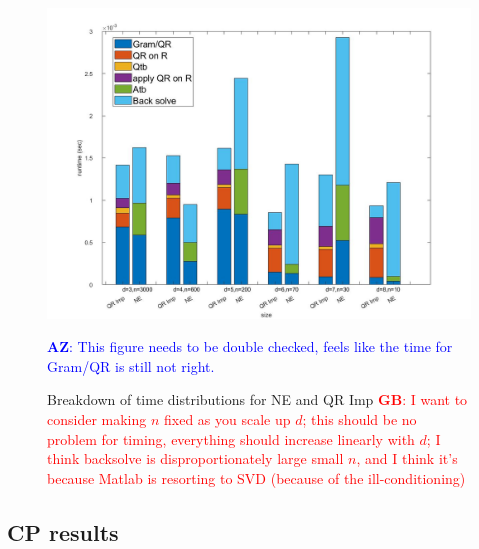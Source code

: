 \documentclass{article}
\newcommand{\GB}[1]{\textcolor{red}{\textbf{GB}: #1}}
\newcommand{\AZ}[1]{\textcolor{blue}{\textbf{AZ}: #1}}
\begin{document}
\begin{figure}[!ht]
  
  \begin{center}
    \includegraphics*[scale = 0.35]{fig_LS_breakdown.jpg}
    \caption[Figure]{Breakdown of time distributions for NE and QR Imp \GB{I want to consider making $n$ fixed as you scale up $d$; this should be no problem for timing, everything should increase linearly with $d$; I think backsolve is disproportionately large small $n$, and I think it's because Matlab is resorting to SVD (because of the ill-conditioning)} \label{fig:LS_problem_breakdown}}

  \end{center}
  \AZ{This figure needs to be double checked, feels like the time for Gram/QR is still not right.}
\end{figure}

\subsection*{CP results}
\end{document}
